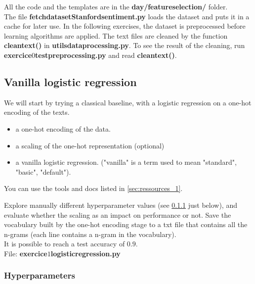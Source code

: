 \documentclass[
10pt, %
a4paper, %
oneside, %
headinclude,footinclude, %
BCOR5mm, %
]{scrartcl}
\begin{document}
All the code and the templates are in the \textbf{day/feature\textunderscore selection/} folder.
\\

The file \textbf{fetch\textunderscore dataset\textunderscore Stanford\textunderscore sentiment.py} loads the dataset and puts it in a cache for later use. In the following exercises, the dataset is preprocessed before learning algorithms are applied. The text files are cleaned by the function \textbf{clean\textunderscore text()} in \textbf{utils\textunderscore data\textunderscore processing.py}. To see the result of the cleaning, run \textbf{exercice\textunderscore $0$\textunderscore test\textunderscore preprocessing.py} and read \textbf{clean\textunderscore text()}.


\subsection{Vanilla logistic regression}
\label{sec:basic}

We will start by trying a classical baseline, with a logistic regression on a one-hot encoding of the texts.

{\color{Purple}{Build a baseline estimator, with a pipeline that will contain the following steps:}}
\begin{itemize}
	\item a one-hot encoding of the data.
	\item a scaling of the one-hot representation (optional)
	\item a vanilla logistic regression. ("vanilla" is a term used to mean "standard", "basic", "default").
\end{itemize}

You can use the tools and docs listed in \ref{sec:ressources_1}.

Explore manually different hyperparameter values (see \ref{sec:hyper_1} just
below), and evaluate whether the scaling as an impact on performance or not.
Save the vocabulary built by the one-hot encoding stage to a txt file that
contains all the n-grams (each line contains a n-gram in the vocabulary).
\\

It is possible to reach a test accuracy of $0.9$.
\\

File: \textbf{exercice\textunderscore $1$\textunderscore logistic\textunderscore regression.py}

\subsubsection{Hyperparameters}
\label{sec:hyper_1}
\end{document}
